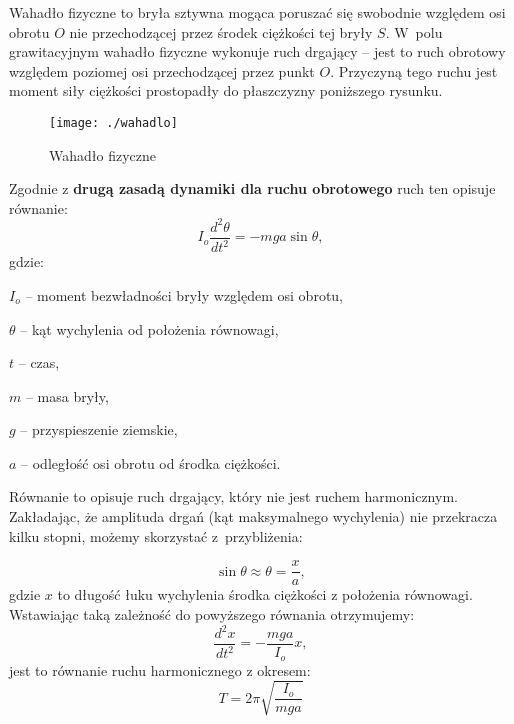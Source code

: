 \documentclass[a4paper,11pt]{article}
\begin{document}
Wahadło fizyczne to bryła sztywna mogąca poruszać się swobodnie względem osi obrotu $O$ nie przechodzącej przez środek ciężkości tej bryły $S$. W~polu grawitacyjnym wahadło fizyczne wykonuje ruch drgający -- jest to ruch obrotowy względem poziomej osi przechodzącej przez punkt $O$. Przyczyną tego ruchu jest moment siły ciężkości prostopadły do płaszczyzny poniższego rysunku.
 
\begin{wrapfigure}{r}{0.38\textwidth}
\texttt{[image: ./wahadlo]}
\caption{Wahadło fizyczne}
\end{wrapfigure}
\noindent Zgodnie z \textbf{drugą zasadą dynamiki dla ruchu obrotowego} ruch ten opisuje równanie:
$$ I_{o}\displaystyle \frac{d^{2}\theta}{dt^{2}}=-mga\sin\theta,$$   
gdzie:

$I_{o}$ -- moment bezwładności bryły względem osi obrotu,

$\theta$ -- kąt wychylenia od położenia równowagi,

$t$ -- czas,

$m$ -- masa bryły,

$g$ -- przyspieszenie ziemskie,

$a$ -- odległość osi obrotu od środka ciężkości.

\noindent Równanie to opisuje ruch drgający, który nie jest ruchem harmonicznym. Zakładając, że amplituda drgań (kąt maksymalnego wychylenia) nie przekracza kilku stopni, możemy skorzystać z~przybliżenia:

$$\displaystyle \sin\theta\approx\theta=\frac{x}{a},$$
gdzie $x$ to długość łuku wychylenia środka ciężkości z położenia równowagi. Wstawiając taką zależność do powyższego równania otrzymujemy:
$$\displaystyle \frac{d^{2}x}{dt^{2}}=-\frac{mga}{I_{o}}x,$$
jest to równanie ruchu harmonicznego z okresem:
$$T=2\pi\sqrt{\frac{I_{o}}{mga}}$$
\end{document}
